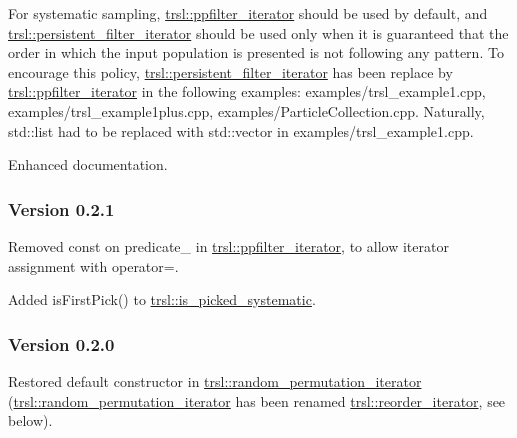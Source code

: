 \begin{DoxyItemize}
\item For systematic sampling, \hyperlink{classtrsl_1_1ppfilter__iterator}{trsl::ppfilter\_\-iterator} should be used by default, and \hyperlink{classtrsl_1_1persistent__filter__iterator}{trsl::persistent\_\-filter\_\-iterator} should be used only when it is guaranteed that the order in which the input population is presented is not following any pattern. To encourage this policy, \hyperlink{classtrsl_1_1persistent__filter__iterator}{trsl::persistent\_\-filter\_\-iterator} has been replace by \hyperlink{classtrsl_1_1ppfilter__iterator}{trsl::ppfilter\_\-iterator} in the following examples: examples/trsl\_\-example1.cpp, examples/trsl\_\-example1plus.cpp, examples/ParticleCollection.cpp. Naturally, {\ttfamily std::list} had to be replaced with {\ttfamily std::vector} in examples/trsl\_\-example1.cpp.
\end{DoxyItemize}


\begin{DoxyItemize}
\item Enhanced documentation.
\end{DoxyItemize}\hypertarget{group__version__history_version_history_v021}{}\subsubsection{Version 0.2.1}\label{group__version__history_version_history_v021}

\begin{DoxyItemize}
\item Removed {\ttfamily const} on {\ttfamily predicate\_\-} in \hyperlink{classtrsl_1_1ppfilter__iterator}{trsl::ppfilter\_\-iterator}, to allow iterator assignment with {\ttfamily operator=}.
\end{DoxyItemize}


\begin{DoxyItemize}
\item Added {\ttfamily isFirstPick()} to \hyperlink{classtrsl_1_1is__picked__systematic}{trsl::is\_\-picked\_\-systematic}.
\end{DoxyItemize}\hypertarget{group__version__history_version_history_v020}{}\subsubsection{Version 0.2.0}\label{group__version__history_version_history_v020}

\begin{DoxyItemize}
\item Restored default constructor in \hyperlink{namespacetrsl_afb566791dfade70af49beaa5b816e7ee}{trsl::random\_\-permutation\_\-iterator} (\hyperlink{namespacetrsl_afb566791dfade70af49beaa5b816e7ee}{trsl::random\_\-permutation\_\-iterator} has been renamed \hyperlink{classtrsl_1_1reorder__iterator}{trsl::reorder\_\-iterator}, see below).
\end{DoxyItemize}


